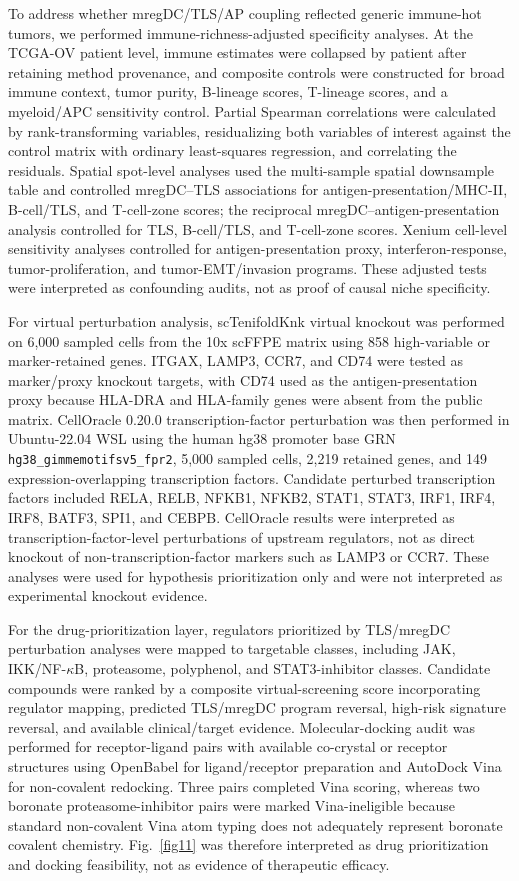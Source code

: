 \documentclass[pdflatex,sn-vancouver-num]{sn-jnl}
\begin{document}
To address whether mregDC/TLS/AP coupling reflected generic immune-hot tumors, we performed immune-richness-adjusted specificity analyses. At the TCGA-OV patient level, immune estimates were collapsed by patient after retaining method provenance, and composite controls were constructed for broad immune context, tumor purity, B-lineage scores, T-lineage scores, and a myeloid/APC sensitivity control. Partial Spearman correlations were calculated by rank-transforming variables, residualizing both variables of interest against the control matrix with ordinary least-squares regression, and correlating the residuals. Spatial spot-level analyses used the multi-sample spatial downsample table and controlled mregDC--TLS associations for antigen-presentation/MHC-II, B-cell/TLS, and T-cell-zone scores; the reciprocal mregDC--antigen-presentation analysis controlled for TLS, B-cell/TLS, and T-cell-zone scores. Xenium cell-level sensitivity analyses controlled for antigen-presentation proxy, interferon-response, tumor-proliferation, and tumor-EMT/invasion programs. These adjusted tests were interpreted as confounding audits, not as proof of causal niche specificity.

For virtual perturbation analysis, scTenifoldKnk virtual knockout was performed on 6,000 sampled cells from the 10x scFFPE matrix using 858 high-variable or marker-retained genes. ITGAX, LAMP3, CCR7, and CD74 were tested as marker/proxy knockout targets, with CD74 used as the antigen-presentation proxy because HLA-DRA and HLA-family genes were absent from the public matrix\cite{bib113}. CellOracle 0.20.0 transcription-factor perturbation was then performed in Ubuntu-22.04 WSL using the human hg38 promoter base GRN \texttt{hg38\_gimmemotifsv5\_fpr2}, 5,000 sampled cells, 2,219 retained genes, and 149 expression-overlapping transcription factors\cite{bib114}. Candidate perturbed transcription factors included RELA, RELB, NFKB1, NFKB2, STAT1, STAT3, IRF1, IRF4, IRF8, BATF3, SPI1, and CEBPB. CellOracle results were interpreted as transcription-factor-level perturbations of upstream regulators, not as direct knockout of non-transcription-factor markers such as LAMP3 or CCR7. These analyses were used for hypothesis prioritization only and were not interpreted as experimental knockout evidence.

For the drug-prioritization layer, regulators prioritized by TLS/mregDC perturbation analyses were mapped to targetable classes, including JAK, IKK/NF-$\kappa$B, proteasome, polyphenol, and STAT3-inhibitor classes. Candidate compounds were ranked by a composite virtual-screening score incorporating regulator mapping, predicted TLS/mregDC program reversal, high-risk signature reversal, and available clinical/target evidence. Molecular-docking audit was performed for receptor-ligand pairs with available co-crystal or receptor structures using OpenBabel for ligand/receptor preparation and AutoDock Vina for non-covalent redocking. Three pairs completed Vina scoring, whereas two boronate proteasome-inhibitor pairs were marked Vina-ineligible because standard non-covalent Vina atom typing does not adequately represent boronate covalent chemistry. Fig.~\ref{fig11} was therefore interpreted as drug prioritization and docking feasibility, not as evidence of therapeutic efficacy.
\end{document}
